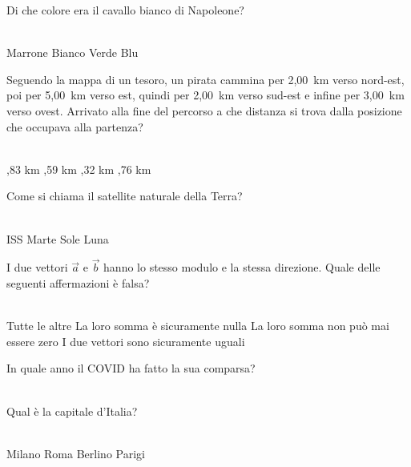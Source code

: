 \documentclass[a4paper,11pt]{exam}
\begin{document}
        \begin{center} 
        \end{center}
\begin{questions}

    
\question Di che colore era il cavallo bianco di Napoleone?\\\
\begin{oneparchoices}
  \choice Marrone
  \choice Bianco
  \choice Verde
  \choice Blu 
\end{oneparchoices}

    
\question Seguendo la mappa di un tesoro, un pirata cammina per 2,00~km verso nord-est, poi per 5,00~km verso est, quindi per 2,00~km verso sud-est e infine per 3,00~km verso ovest. Arrivato alla fine del percorso a che distanza si trova dalla posizione che occupava alla partenza?\\\
\begin{oneparchoices}
  ,83 km
  ,59 km
  ,32 km
  \choice 4,76 km
\end{oneparchoices}

    
\question Come si chiama il satellite naturale della Terra?\\\
\begin{oneparchoices}
  \choice ISS
  \choice Marte
  \choice Sole
  \choice Luna
\end{oneparchoices}

    
\question I due vettori $\vec{a}$ e $\vec{b}$ hanno lo stesso modulo e la stessa direzione. Quale delle seguenti affermazioni è falsa?\\\
\begin{oneparchoices}
  \choice Tutte le altre
  \choice La loro somma è sicuramente nulla
  \choice La loro somma non può mai essere zero
  \choice I due vettori sono sicuramente uguali
\end{oneparchoices}

    
\question In quale anno il COVID ha fatto la sua comparsa?\\\
\begin{oneparchoices}
  \choice 2020
  \choice 2001
  \choice 2019
  \choice 1943
\end{oneparchoices}

    
\question Qual è la capitale d’Italia?\\\
\begin{oneparchoices}
  \choice Milano
  \choice Roma
  \choice Berlino
  \choice Parigi
\end{oneparchoices}


\end{questions}
\end{document}

